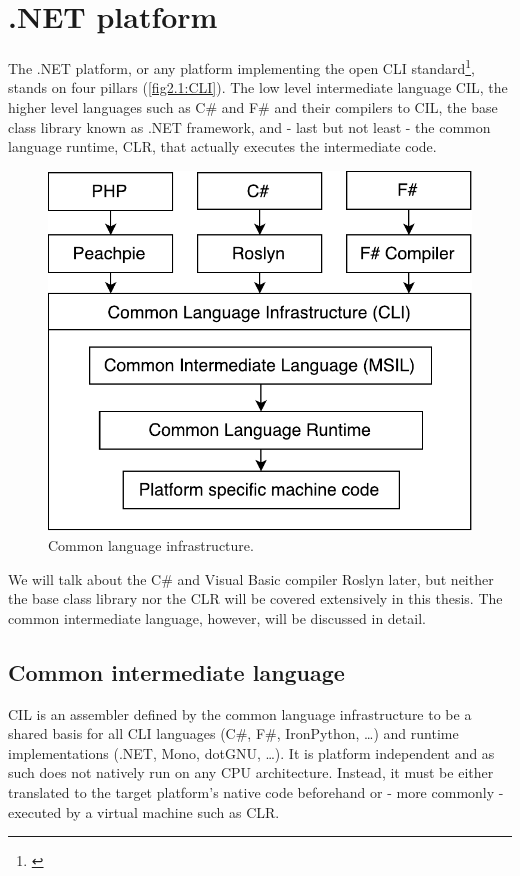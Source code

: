 \chapter{.NET platform}

The .NET platform, or any platform implementing the open CLI standard\footnote{\citep{CLIEcma}}, stands on four pillars (\autoref{fig2.1:CLI}). The low level intermediate language CIL, the higher level languages such as C\# and F\# and their compilers to CIL, the base class library known as .NET framework, and - last but not least - the common language runtime, CLR, that actually executes the intermediate code.

\begin{figure}[h]
	\centering	
	\includegraphics[scale=0.75]{../img/2_1_CLI}	
	\caption{Common language infrastructure.}
	\label{fig2.1:CLI}
\end{figure}

We will talk about the C\# and Visual Basic compiler Roslyn later, but neither the base class library nor the CLR will be covered extensively in this thesis. The common intermediate language, however, will be discussed in detail. 

\section{Common intermediate language}\label{CIL}

CIL is an assembler defined by the common language infrastructure \citep{CLIEcma} to be a shared basis for all CLI languages (C\#, F\#, IronPython, …) and runtime implementations (.NET, Mono, dotGNU, …). It is platform independent and as such does not natively run on any CPU architecture. Instead, it must be either translated to the target platform’s native code beforehand or - more commonly - executed by a virtual machine such as CLR.

